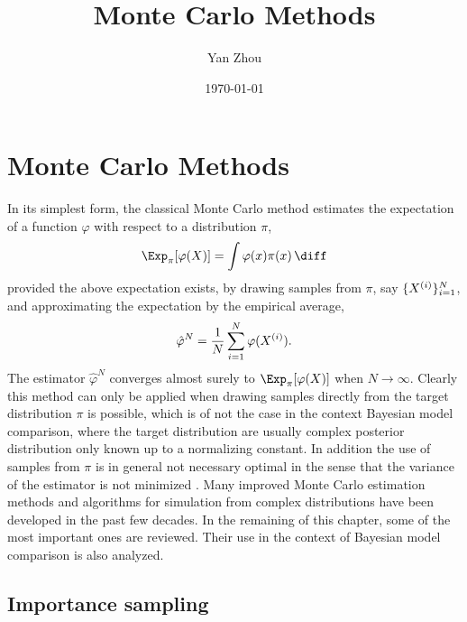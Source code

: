 \documentclass[11pt, hyper, bib, fontset=Minion]{marticle}
\title{Monte Carlo Methods}
\author{Yan Zhou}
\date{\today}
\begin{document}
\maketitle

\else %

\chapter{Monte Carlo Methods}
\label{cha:Monte Carlo Methods}

\fi %

In its simplest form, the classical Monte Carlo method estimates the
expectation of a function $\varphi$ with respect to a distribution $\pi$,
\begin{equation}
  \Exp_{\pi}[\varphi(X)] = \int\varphi(x)\pi(x)\intd
\end{equation}
provided the above expectation exists, by drawing \iid samples from $\pi$, say
$\{X^{(i)}\}_{i=1}^N$, and approximating the expectation by the empirical average,
\begin{equation}
  \hat\varphi^N = \frac{1}{N}\sum_{i=1}^N\varphi(X^{(i)}).
  \label{eq:vanilla mc}
\end{equation}
The estimator $\hat\varphi^N$ converges almost surely to
$\Exp_{\pi}[\varphi(X)]$ when $N\to\infty$.  Clearly this method can only be
applied when drawing samples directly from the target distribution $\pi$ is
possible, which is of not the case in the context Bayesian model comparison,
where the target distribution are usually complex posterior distribution only
known up to a normalizing constant. In addition the use of samples from $\pi$
is in general not necessary optimal in the sense that the variance of the
estimator is not minimized \parencite[see][sec.~3.3]{Robert:2004tn}. Many
improved Monte Carlo estimation methods and algorithms for simulation from
complex distributions have been developed in the past few decades. In the
remaining of this chapter, some of the most important ones are reviewed. Their
use in the context of Bayesian model comparison is also analyzed.

\section{Importance sampling}
\label{sec:Importance sampling}
\end{document}
